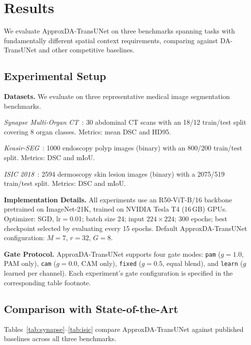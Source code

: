 \section{Results}
\label{sec:experiments}

We evaluate ApproxDA-TransUNet on three benchmarks spanning tasks with fundamentally different spatial context requirements, comparing against DA-TransUNet and other competitive baselines.

\subsection{Experimental Setup}

\textbf{Datasets.} We evaluate on three representative medical image segmentation benchmarks.

\textit{Synapse Multi-Organ CT}~\cite{landman2015miccai}: 30 abdominal CT scans with an 18/12 train/test split covering 8 organ classes. Metrics: mean DSC and HD95.

\textit{Kvasir-SEG}~\cite{jha2020kvasir}: 1000 endoscopy polyp images (binary) with an 800/200 train/test split. Metrics: DSC and mIoU.

\textit{ISIC 2018}~\cite{codella2019isic}: 2594 dermoscopy skin lesion images (binary) with a 2075/519 train/test split. Metrics: DSC and mIoU.

\textbf{Implementation Details.} All experiments use an R50-ViT-B/16 backbone pretrained on ImageNet-21K, trained on NVIDIA Tesla T4 (16\,GB) GPUs. Optimizer: SGD, lr$=$0.01; batch size 24; input $224{\times}224$; 300 epochs; best checkpoint selected by evaluating every 15 epochs. Default ApproxDA-TransUNet configuration: $M{=}7$, $r{=}32$, $G{=}8$.

\textbf{Gate Protocol.} ApproxDA-TransUNet supports four gate modes: \texttt{pam} ($g{=}1.0$, PAM only), \texttt{cam} ($g{=}0.0$, CAM only), \texttt{fixed} ($g{=}0.5$, equal blend), and \texttt{learn} ($g$ learned per channel). Each experiment's gate configuration is specified in the corresponding table footnote.

\subsection{Comparison with State-of-the-Art}

Tables~\ref{tab:synapse}--\ref{tab:isic} compare ApproxDA-TransUNet against published baselines across all three benchmarks.

